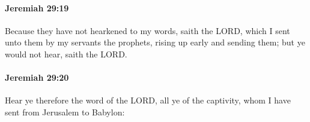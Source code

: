 		\paragraph{Jeremiah 29:19} %
			\label{JEREMIAH-29-19}

			Because they have not hearkened to my words, saith the LORD, which I sent unto them by my servants the prophets, rising up early and sending them; but ye would not hear, saith the LORD.


		\paragraph{Jeremiah 29:20} %
			\label{JEREMIAH-29-20}

			Hear ye therefore the word of the LORD, all ye of the captivity, whom I have sent from Jerusalem to Babylon:


